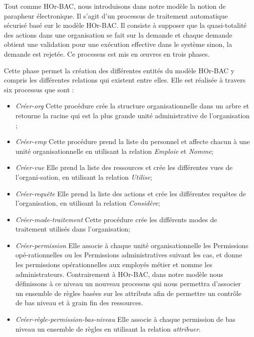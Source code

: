Tout comme HOr-BAC, nous introduisons dans notre modèle la notion de parapheur électronique. Il s'agit d'un processus de traitement automatique sécurisé basé sur le modèle HOr-BAC. Il consiste à supposer que la quasi-totalité des actions dans une organisation se fait sur la demande et chaque demande obtient une validation pour une exécution effective dans le système sinon, la demande est rejetée. Ce processus est mis en œuvres en trois phases.

\label{sectionPhaseInitialisation}

Cette phase permet la création des différentes entités du modèle HOr-BAC y compris les différentes relations qui existent entre elles. Elle est réalisée à travers six processus que sont :
\begin{itemize}
\item \textit{Créer-org} Cette procédure crée la structure organisationnelle dans un arbre et retourne la racine qui est la plus grande unité administrative de l'organisation ;
\item \textit{Créer-emp} Cette procédure prend la liste du personnel et affecte chacun à une unité organisationnelle en utilisant la relation \textit{Emploie} et \textit{Nomme};
\item \textit{Créer-vue} Elle prend la liste des ressources et crée les différentes vues de l'organi-sation, en utilisant la relation \textit{Utilise};
\item \textit{Créer-requête} Elle prend la liste des actions et crée les différentes requêtes de l'organisation, en utilisant la relation \textit{Considère};
\item \textit{Créer-mode-traitement} Cette procédure crée les différents modes de traitement utilisés dans l'organisation;
\item \textit{Créer-permission} Elle associe à chaque unité organisationnelle les Permissions
opé-rationnelles ou les Permissions administratives suivant les cas, et donne les permissions opérationnelles aux employés métier et nomme les administrateurs.
\hspace*{0.5cm} Contrairement à HOr-BAC, dans notre modèle nous définissons à ce niveau un nouveau processus qui nous permettra d'associer un ensemble de règles basées sur les attributs afin de permettre un contrôle de bas niveau et à grain fin des ressources.
\item \textit{Créer-règle-permission-bas-niveau} Elle associe à chaque permission de bas niveau un ensemble de règles en utilisant la relation \textit{attribuer}.
\end{itemize}
  

